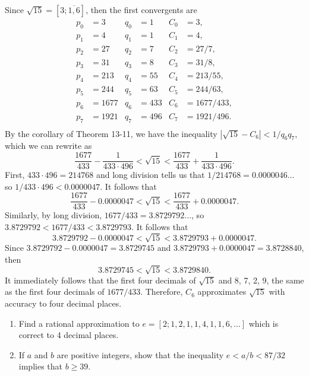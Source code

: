 \begin{solution}
    Since $\sqrt{15} = [3; \overline{1, 6}]$, then the first convergents are
    \begin{align*}
        p_0 &= 3 & q_0 &= 1 & C_0 &= 3, \\
        p_1 &= 4 & q_1 &= 1 & C_1 &= 4, \\
        p_2 &= 27 & q_2 &= 7 & C_2 &= 27/7, \\
        p_3 &= 31 & q_3 &= 8 & C_3 &= 31/8, \\
        p_4 &= 213 & q_4 &= 55 & C_4 &= 213/55, \\
        p_5 &= 244 & q_5 &= 63 & C_5 &= 244/63, \\
        p_6 &= 1677 & q_6 &= 433 & C_6 &= 1677/433, \\
        p_7 &= 1921 & q_7 &= 496 & C_7 &= 1921/496. \\
    \end{align*}
    By the corollary of Theorem 13-11, we have the inequality $|\sqrt{15} - C_6| < 1/q_6q_7$, which we can rewrite as
    $$\frac{1677}{433} - \frac{1}{433\cdot 496} < \sqrt{15} < \frac{1677}{433} + \frac{1}{433\cdot 496}.$$
    First, $433\cdot 496 = 214768$ and long division tells us that $1/214768 = 0.0000046...$ so $1/433\cdot 496 < 0.0000047$. It follows that
    $$\frac{1677}{433} - 0.0000047 < \sqrt{15} < \frac{1677}{433} + 0.0000047.$$
    Similarly, by long division, $1677/433 = 3.8729792...$, so $3.8729792 < 1677/433 < 3.8729793$. It follows that
    $$3.8729792 - 0.0000047 < \sqrt{15} < 3.8729793 + 0.0000047.$$
    Since $3.8729792 - 0.0000047 = 3.8729745$ and $3.8729793 + 0.0000047 = 3.8728840$, then
    $$3.8729745 < \sqrt{15} < 3.8729840.$$
    It immediately follows that the first four decimals of $\sqrt{15}$ and 8, 7, 2, 9, the same as the first four decimals of $1677/433$. Therefore, $C_6$ approximates $\sqrt{15}$ with accuracy to four decimal places. \\
\end{solution}

\begin{exercise}
    \begin{enumerate}
        \item Find a rational approximation to $e = [2; 1, 2, 1, 1, 4, 1, 1, 6, ...]$ which is correct to 4 decimal places.
        \item If $a$ and $b$ are positive integers, show that the inequality $e < a/b < 87/32$ implies that $b \geq 39$.\\
    \end{enumerate}
\end{exercise}

